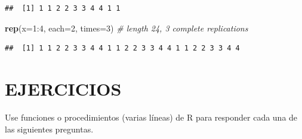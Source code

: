 \documentclass[10pt,]{krantz}
\makeatletter
\newenvironment{Shaded}{\begin{snugshade}}{\end{snugshade}}
\newcommand{\KeywordTok}[1]{\textcolor[rgb]{0.13,0.29,0.53}{\textbf{{#1}}}}
\newcommand{\DataTypeTok}[1]{\textcolor[rgb]{0.13,0.29,0.53}{{#1}}}
\newcommand{\DecValTok}[1]{\textcolor[rgb]{0.00,0.00,0.81}{{#1}}}
\newcommand{\CommentTok}[1]{\textcolor[rgb]{0.56,0.35,0.01}{\textit{{#1}}}}
\newcommand{\NormalTok}[1]{{#1}}
\let\proglang=\textsf
\newenvironment{kframe}{%
\medskip{}
\setlength{\fboxsep}{.8em}
 \def\at@end@of@kframe{}%
 \ifinner\ifhmode%
  \def\at@end@of@kframe{\end{minipage}}%
  \begin{minipage}{\columnwidth}%
 \fi\fi%
 \def\FrameCommand##1{\hskip\@totalleftmargin \hskip-\fboxsep
 \colorbox{shadecolor}{##1}\hskip-\fboxsep
     \hskip-\linewidth \hskip-\@totalleftmargin \hskip\columnwidth}%
 \MakeFramed {\advance\hsize-\width
   \@totalleftmargin\z@ \linewidth\hsize
   \@setminipage}}%
 {\par\unskip\endMakeFramed%
 \at@end@of@kframe}
\renewenvironment{Shaded}{\begin{kframe}}{\end{kframe}}
\makeatother
\begin{document}
\begin{verbatim}
##  [1] 1 1 2 2 3 3 4 4 1 1
\end{verbatim}

\begin{Shaded}
\begin{Highlighting}[]
\KeywordTok{rep}\NormalTok{(}\DataTypeTok{x=}\DecValTok{1}\NormalTok{:}\DecValTok{4}\NormalTok{, }\DataTypeTok{each=}\DecValTok{2}\NormalTok{, }\DataTypeTok{times=}\DecValTok{3}\NormalTok{)  }\CommentTok{# length 24, 3 complete replications}
\end{Highlighting}
\end{Shaded}

\begin{verbatim}
##  [1] 1 1 2 2 3 3 4 4 1 1 2 2 3 3 4 4 1 1 2 2 3 3 4 4
\end{verbatim}

\section*{EJERCICIOS}\label{ejercicios}


Use funciones o procedimientos (varias líneas) de \proglang{R} para
responder cada una de las siguientes preguntas.
\end{document}
